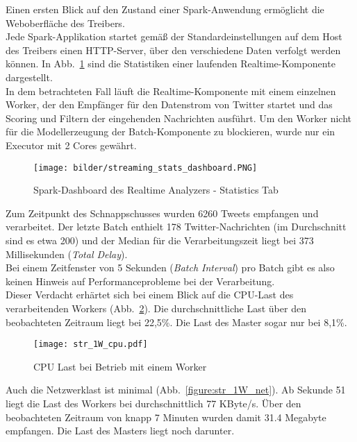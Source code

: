 Einen ersten Blick auf den Zustand einer Spark-Anwendung ermöglicht die Weboberfläche des Treibers.\\

Jede Spark-Applikation startet gemäß der Standardeinstellungen auf dem Host des Treibers einen HTTP-Server, über den verschiedene Daten verfolgt werden können. In Abb.~\ref{figure:realtime_dashboard_stats} sind die Statistiken einer laufenden Realtime-Komponente dargestellt.\\

In dem betrachteten Fall läuft die Realtime-Komponente mit einem einzelnen Worker, der den Empfänger für den Datenstrom von Twitter startet und das Scoring und Filtern der eingehenden Nachrichten ausführt. Um den Worker nicht für die Modellerzeugung der Batch-Komponente zu blockieren, wurde nur ein Executor mit 2 Cores gewährt.

\begin{figure}[ht!]
	\centering
	\texttt{[image: bilder/streaming\_stats\_dashboard.PNG]}
	\caption{Spark-Dashboard des Realtime Analyzers - Statistics Tab}
	\label{figure:realtime_dashboard_stats}
\end{figure}

Zum Zeitpunkt des Schnappschusses wurden 6260 Tweets empfangen und verarbeitet. Der letzte Batch enthielt 178 Twitter-Nachrichten (im Durchschnitt sind es etwa 200) und der Median für die Verarbeitungszeit liegt bei 373 Millisekunden (\textit{Total Delay}).\\

Bei einem Zeitfenster von 5 Sekunden (\textit{Batch Interval}) pro Batch gibt es also keinen Hinweis auf Performanceprobleme bei der Verarbeitung.\\

Dieser Verdacht erhärtet sich bei einem Blick auf die CPU-Last des verarbeitenden Workers (Abb.~\ref{figure:str_1W_cpu}). Die durchschnittliche Last über den beobachteten Zeitraum liegt bei 22,5\%. Die Last des Master sogar nur bei 8,1\%.

\begin{figure}[ht!]
	\centering
	\texttt{[image: str\_1W\_cpu.pdf]}
	\caption{CPU Last bei Betrieb mit einem Worker}
	\label{figure:str_1W_cpu}
\end{figure}

Auch die Netzwerklast ist minimal (Abb.~\ref{figure:str_1W_net}). Ab Sekunde 51 liegt die Last des Workers bei durchschnittlich 77 KByte/s. Über den beobachteten Zeitraum von knapp 7 Minuten wurden damit 31.4 Megabyte empfangen. Die Last des Masters liegt noch darunter.

